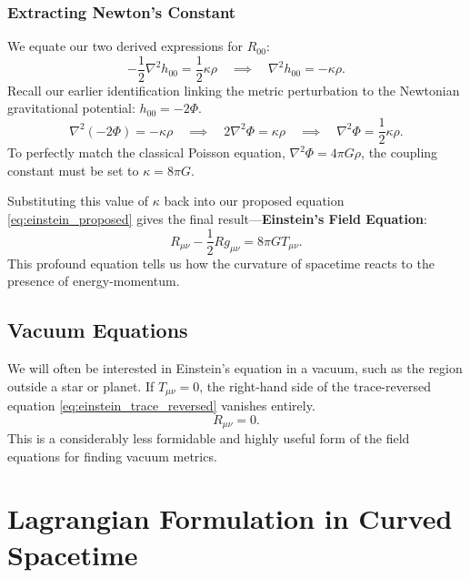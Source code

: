 \documentclass[11pt, a4paper]{report}
\begin{document}
\subsubsection*{Extracting Newton's Constant}
We equate our two derived expressions for $R_{00}$: %
\begin{equation}
-\frac{1}{2}\nabla^{2}h_{00} = \frac{1}{2}\kappa\rho \quad \implies \quad \nabla^{2}h_{00} = -\kappa\rho. %
\end{equation}
Recall our earlier identification linking the metric perturbation to the Newtonian gravitational potential: $h_{00} = -2\Phi$. %
\begin{equation}
\nabla^{2}(-2\Phi) = -\kappa\rho \quad \implies \quad 2\nabla^{2}\Phi = \kappa\rho \quad \implies \quad \nabla^{2}\Phi = \frac{1}{2}\kappa\rho.
\end{equation}
To perfectly match the classical Poisson equation, $\nabla^{2}\Phi = 4\pi G\rho$, the coupling constant must be set to $\kappa = 8\pi G$. %

Substituting this value of $\kappa$ back into our proposed equation \eqref{eq:einstein_proposed} gives the final result—\textbf{Einstein's Field Equation}: %
\begin{equation}
\label{eq:einstein_field_equation}
R_{\mu\nu} - \frac{1}{2}R g_{\mu\nu} = 8\pi G T_{\mu\nu}. %
\end{equation}
This profound equation tells us how the curvature of spacetime reacts to the presence of energy-momentum. %

\subsection{Vacuum Equations}

We will often be interested in Einstein's equation in a vacuum, such as the region outside a star or planet. %
If $T_{\mu\nu} = 0$, the right-hand side of the trace-reversed equation \eqref{eq:einstein_trace_reversed} vanishes entirely. %
\begin{equation}
R_{\mu\nu} = 0. %
\end{equation}
This is a considerably less formidable and highly useful form of the field equations for finding vacuum metrics. %
\section*{Lagrangian Formulation in Curved Spacetime}
\end{document}
